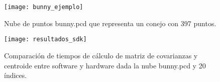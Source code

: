 \begin{figure}[!htb]
\centering
\texttt{[image: bunny\_ejemplo]}
\caption{Nube de puntos bunny.pcd que representa un conejo con 397 puntos.}\label{fig:bunny_ejemplo}
\end{figure}


\begin{figure}[!htb]
\centering
\texttt{[image: resultados\_sdk]}
\caption{Comparación de tiempos de cálculo de matriz de covarianzas y centroide entre software y hardware dada la nube bunny.pcd y 20 índices.}\label{fig:resultados_sdk}
\end{figure}




